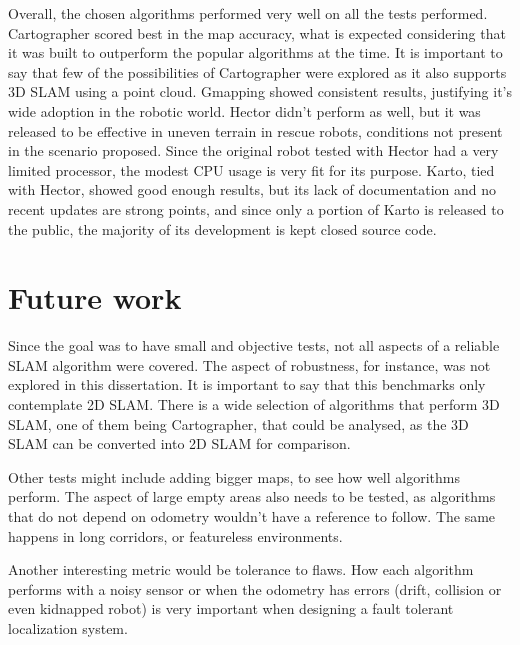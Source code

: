 Overall, the chosen algorithms performed very well on all the tests performed. Cartographer scored best in the map accuracy, what is expected considering that it was built to outperform the popular algorithms at the time. It is important to say that few of the possibilities of Cartographer were explored as it also supports 3D SLAM using a point cloud. Gmapping showed consistent results, justifying it's wide adoption in the robotic world. Hector didn't perform as well, but it was released to be effective in uneven terrain in rescue robots, conditions not present in the scenario proposed. Since the original robot tested with Hector had a very limited processor, the modest CPU usage is very fit for its purpose. Karto, tied with Hector, showed good enough results, but its lack of documentation and no recent updates are strong points, and since only a portion of Karto is released to the public, the majority of its development is kept closed source code.

\section{Future work}

Since the goal was to have small and objective tests, not all aspects of a reliable SLAM algorithm were covered. The aspect of robustness, for instance, was not explored in this dissertation. It is important to say that this benchmarks only contemplate 2D SLAM. There is a wide selection of algorithms that perform 3D SLAM, one of them being Cartographer, that could be analysed, as the 3D SLAM can be converted into 2D SLAM for comparison.

Other tests might include adding bigger maps, to see how well algorithms perform. The aspect of large empty areas also needs to be tested, as algorithms that do not depend on odometry wouldn't have a reference to follow. The same happens in long corridors, or featureless environments.

Another interesting metric would be tolerance to flaws. How each algorithm performs with a noisy sensor or when the odometry has errors (drift, collision or even kidnapped robot) is very important when designing a fault tolerant localization system.


